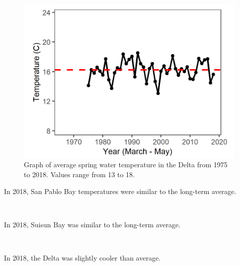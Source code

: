 \documentclass[
]{book}
\begin{document}
\begin{panel-grid}
\begin{columns-nocenter}
\begin{column800}
\begin{expand}
\begin{figure}
\includegraphics[width=15.25in]{figures/temp_dtspring} \caption{Graph of average spring water temperature in the Delta from 1975 to 2018. Values range from 13 to 18.}\label{fig:unnamed-chunk-16}
\end{figure}

\end{expand}

\end{column800}

\end{columns-nocenter}

\begin{columns-nocenter}

\begin{column800}

In 2018, San Pablo Bay temperatures were similar to the long-term average.

\end{column800}

\begin{column40}

~

\end{column40}

\begin{column800}

In 2018, Suisun Bay was similar to the long-term average.

\end{column800}

\begin{column40}

~

\end{column40}

\begin{column800}

In 2018, the Delta was slightly cooler than average.

\end{column800}

\end{columns-nocenter}

\end{panel-grid}
\end{document}
